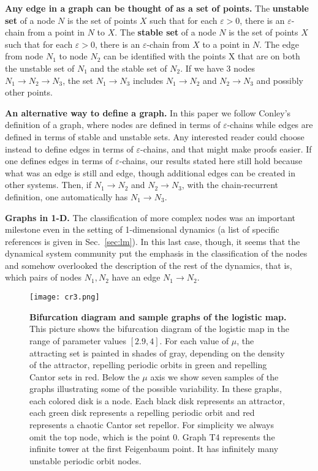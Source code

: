 \documentclass{article}
\def\edge{\to}
\newcommand{\allblack}{\color{black}{}}
\newcommand{\jim}{\color{black} }
\newcommand{\yz}{\allblack}
\begin{document}
{\jim
{\bf Any edge in a graph can be thought of as a set of points.}
The {\bf unstable set} of a node $N$ is the set of points $X$ such that for each $\varepsilon >0$, there is an $\varepsilon$-chain from a point in $N$ to $X$.
The {\bf stable set} of a node $N$ is the set of points $X$ such that for each $\varepsilon >0$, there is an $\varepsilon$-chain from $X$ to a point in $N$.
The edge from node $N_1$ to node $N_2$ can be identified with the points X that are on both the unstable set of $N_1$ and the stable set of $N_2$.
If we have 3 nodes $N_1\to N_2\to N_3$, the set $N_1\to  N_3$ includes
$N_1\to N_2$ and $N_2\to N_3$ and possibly other points.

{\bf An alternative way to define a graph.} In this paper we follow Conley's definition of a graph, where nodes are defined in terms of $\varepsilon$-chains while edges are defined in terms of stable and unstable sets.
Any interested reader could choose instead to define edges in terms of $\varepsilon$-chains, and that might make proofs easier. 
If one defines edges in terms of $\varepsilon$-chains, our results stated here still hold because what was an edge is still and edge, though additional edges can be created in other systems. 
Then, if $N_1\to N_2$ and $N_2\to N_3$, with the chain-recurrent definition, one automatically has $N_1\to  N_3$.
}

\yz
{\bf Graphs in 1-D.} The classification of more complex nodes was an important milestone even in the setting of 1-dimensional dynamics (a list of specific references is given in Sec.~\ref{sec:lm}). 
In this last case, though, it seems that the dynamical system community put the emphasis in the classification of the nodes and somehow overlooked the description of the rest of the dynamics,
that is, which pairs of nodes $N_1,N_2$ have an edge {$N_1\edge N_2$}.


%
\begin{figure}
 \centering
 \texttt{[image: cr3.png]}
  \caption{{\bf Bifurcation diagram and sample graphs of the logistic map.} 
  This picture shows the bifurcation diagram of the logistic map in the range of parameter values $[2.9,4]$.
  For each value of $\mu$, the attracting set is painted in shades of gray, depending on the density of the attractor, repelling periodic orbits in green and repelling Cantor sets in red. Below the $\mu$ axis we show seven samples of the graphs illustrating some of the possible variability. In these graphs, each colored disk is a node. Each black disk represents an attractor, each green disk represents a repelling periodic orbit and red represents a chaotic Cantor set repellor. For simplicity we always omit the top node, which is the point 0. Graph T4 represents the infinite tower at the first Feigenbaum point. It has infinitely many unstable periodic orbit nodes.
  }
  \label{fig:full}
\end{figure}
\end{document}
